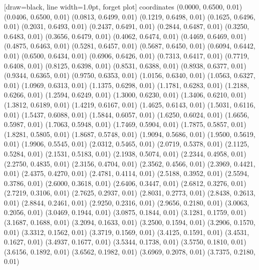 [draw=black, line width=1.0pt, forget plot] coordinates {
    (0.0000, 0.6500, 0.01)
    (0.0406, 0.6500, 0.01)
    (0.0813, 0.6499, 0.01)
    (0.1219, 0.6498, 0.01)
    (0.1625, 0.6496, 0.01)
    (0.2031, 0.6493, 0.01)
    (0.2437, 0.6491, 0.01)
    (0.2844, 0.6487, 0.01)
    (0.3250, 0.6483, 0.01)
    (0.3656, 0.6479, 0.01)
    (0.4062, 0.6474, 0.01)
    (0.4469, 0.6469, 0.01)
    (0.4875, 0.6463, 0.01)
    (0.5281, 0.6457, 0.01)
    (0.5687, 0.6450, 0.01)
    (0.6094, 0.6442, 0.01)
    (0.6500, 0.6434, 0.01)
    (0.6906, 0.6426, 0.01)
    (0.7313, 0.6417, 0.01)
    (0.7719, 0.6408, 0.01)
    (0.8125, 0.6398, 0.01)
    (0.8531, 0.6388, 0.01)
    (0.8938, 0.6377, 0.01)
    (0.9344, 0.6365, 0.01)
    (0.9750, 0.6353, 0.01)
    (1.0156, 0.6340, 0.01)
    (1.0563, 0.6327, 0.01)
    (1.0969, 0.6313, 0.01)
    (1.1375, 0.6298, 0.01)
    (1.1781, 0.6283, 0.01)
    (1.2188, 0.6266, 0.01)
    (1.2594, 0.6249, 0.01)
    (1.3000, 0.6230, 0.01)
    (1.3406, 0.6210, 0.01)
    (1.3812, 0.6189, 0.01)
    (1.4219, 0.6167, 0.01)
    (1.4625, 0.6143, 0.01)
    (1.5031, 0.6116, 0.01)
    (1.5437, 0.6088, 0.01)
    (1.5844, 0.6057, 0.01)
    (1.6250, 0.6024, 0.01)
    (1.6656, 0.5987, 0.01)
    (1.7063, 0.5948, 0.01)
    (1.7469, 0.5904, 0.01)
    (1.7875, 0.5857, 0.01)
    (1.8281, 0.5805, 0.01)
    (1.8687, 0.5748, 0.01)
    (1.9094, 0.5686, 0.01)
    (1.9500, 0.5619, 0.01)
    (1.9906, 0.5545, 0.01)
    (2.0312, 0.5465, 0.01)
    (2.0719, 0.5378, 0.01)
    (2.1125, 0.5284, 0.01)
    (2.1531, 0.5183, 0.01)
    (2.1938, 0.5074, 0.01)
    (2.2344, 0.4958, 0.01)
    (2.2750, 0.4835, 0.01)
    (2.3156, 0.4704, 0.01)
    (2.3562, 0.4566, 0.01)
    (2.3969, 0.4421, 0.01)
    (2.4375, 0.4270, 0.01)
    (2.4781, 0.4114, 0.01)
    (2.5188, 0.3952, 0.01)
    (2.5594, 0.3786, 0.01)
    (2.6000, 0.3618, 0.01)
    (2.6406, 0.3447, 0.01)
    (2.6812, 0.3276, 0.01)
    (2.7219, 0.3106, 0.01)
    (2.7625, 0.2937, 0.01)
    (2.8031, 0.2773, 0.01)
    (2.8438, 0.2613, 0.01)
    (2.8844, 0.2461, 0.01)
    (2.9250, 0.2316, 0.01)
    (2.9656, 0.2180, 0.01)
    (3.0063, 0.2056, 0.01)
    (3.0469, 0.1944, 0.01)
    (3.0875, 0.1844, 0.01)
    (3.1281, 0.1759, 0.01)
    (3.1687, 0.1688, 0.01)
    (3.2094, 0.1633, 0.01)
    (3.2500, 0.1594, 0.01)
    (3.2906, 0.1570, 0.01)
    (3.3312, 0.1562, 0.01)
    (3.3719, 0.1569, 0.01)
    (3.4125, 0.1591, 0.01)
    (3.4531, 0.1627, 0.01)
    (3.4937, 0.1677, 0.01)
    (3.5344, 0.1738, 0.01)
    (3.5750, 0.1810, 0.01)
    (3.6156, 0.1892, 0.01)
    (3.6562, 0.1982, 0.01)
    (3.6969, 0.2078, 0.01)
    (3.7375, 0.2180, 0.01)
}
